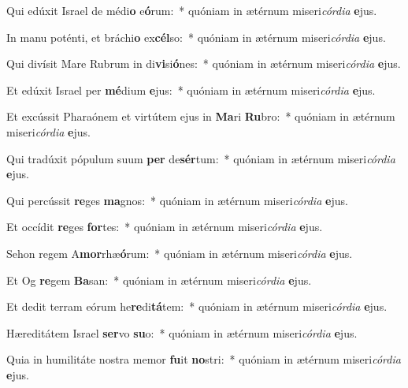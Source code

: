 \item Qui edúxit Israel de médi\textbf{o} e\textbf{ó}rum:~* quóniam in ætérnum miseri\hspace{0.03em}\textit{córdia} \textbf{e}jus.
\item In manu poténti, et bráchi\textbf{o} ex\textbf{cél}so:~* quóniam in ætérnum miseri\hspace{0.03em}\textit{córdia} \textbf{e}jus.
\item Qui divísit Mare Rubrum in di\textbf{vi}si\textbf{ó}nes:~* quóniam in ætérnum miseri\hspace{0.03em}\textit{córdia} \textbf{e}jus.
\item Et edúxit Israel per \textbf{mé}dium \textbf{e}jus:~* quóniam in ætérnum miseri\hspace{0.03em}\textit{córdia} \textbf{e}jus.
\item Et excússit Pharaónem et virtútem ejus in \textbf{Ma}ri \textbf{Ru}bro:~* quóniam in ætérnum miseri\hspace{0.03em}\textit{córdia} \textbf{e}jus.
\item Qui tradúxit pópulum suum \textbf{per} de\textbf{sér}tum:~* quóniam in ætérnum miseri\hspace{0.03em}\textit{córdia} \textbf{e}jus.
\item Qui percússit \textbf{re}ges \textbf{ma}gnos:~* quóniam in ætérnum miseri\hspace{0.03em}\textit{córdia} \textbf{e}jus.
\item Et occídit \textbf{re}ges \textbf{for}tes:~* quóniam in ætérnum miseri\hspace{0.03em}\textit{córdia} \textbf{e}jus.
\item Sehon regem A\textbf{mor}rhæ\textbf{ó}rum:~* quóniam in ætérnum miseri\hspace{0.03em}\textit{córdia} \textbf{e}jus.
\item Et Og \textbf{re}gem \textbf{Ba}san:~* quóniam in ætérnum miseri\hspace{0.03em}\textit{córdia} \textbf{e}jus.
\item Et dedit terram eórum he\textbf{re}di\textbf{tá}tem:~* quóniam in ætérnum miseri\hspace{0.03em}\textit{córdia} \textbf{e}jus.
\item Hæreditátem Israel \textbf{ser}vo \textbf{su}o:~* quóniam in ætérnum miseri\hspace{0.03em}\textit{córdia} \textbf{e}jus.
\item Quia in humilitáte nostra memor \textbf{fu}it \textbf{no}stri:~* quóniam in ætérnum miseri\hspace{0.03em}\textit{córdia} \textbf{e}jus.
